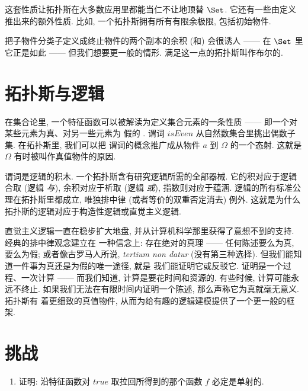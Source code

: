 这套性质让拓扑斯在大多数应用里都能当仁不让地顶替 $\Set$. 它还有一些由定义推出来的额外性质. 比如,
一个拓扑斯拥有所有有限余极限, 包括初始物件.

把子物件分类子定义成终止物件的两个副本的余积 (和) 会很诱人 —— 在 $\Set$ 里它正是如此 ——
但我们想要更一般的情形. 满足这一点的拓扑斯叫作布尔的.

\section{拓扑斯与逻辑}

在集合论里, 一个特征函数可以被解读为定义集合元素的一条性质 —— 即一个对某些元素为真、对另一些元素为
假的 . 谓词 $isEven$ 从自然数集合里挑出偶数子集. 在拓扑斯里, 我们可以把
谓词的概念推广成从物件 $a$ 到 $\Omega$ 的一个态射. 这就是 $\Omega$ 有时被叫作真值物件的原因.

谓词是逻辑的积木. 一个拓扑斯含有研究逻辑所需的全部器械. 它的积对应于逻辑合取 (逻辑 \emph{与}),
余积对应于析取 (逻辑 \emph{或}), 指数则对应于蕴涵. 逻辑的所有标准公理在拓扑斯里都成立, 唯独排中律
(或者等价的双重否定消去) 例外. 这就是为什么拓扑斯的逻辑对应于构造性逻辑或直觉主义逻辑.

直觉主义逻辑一直在稳步扩大地盘, 并从计算机科学那里获得了意想不到的支持. 经典的排中律观念建立在
一种信念上: 存在绝对的真理 —— 任何陈述要么为真, 要么为假; 或者像古罗马人所说,
\emph{tertium non datur} (没有第三种选择). 但我们能知道一件事为真还是为假的唯一途径, 就是
我们能证明它或反驳它. 证明是一个过程、一次计算 —— 而我们知道, 计算是要花时间和资源的. 有些时候,
计算可能永远不终止. 如果我们无法在有限时间内证明一个陈述, 那么声称它为真就毫无意义. 拓扑斯有
着更细致的真值物件, 从而为给有趣的逻辑建模提供了一个更一般的框架.

\section{挑战}

\begin{enumerate}
  \tightlist
  \item
证明: 沿特征函数对 $true$ 取拉回所得到的那个函数 $f$ 必定是单射的.
\end{enumerate}
